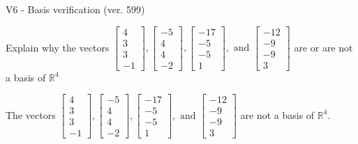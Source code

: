 \begin{exercise}
  \begin{exerciseTitle}V6 - Basis verification (ver. 599)\end{exerciseTitle}
  \begin{exerciseStatement}
    Explain why the vectors \(\left[\begin{array}{r}
4 \\
3 \\
3 \\
-1
\end{array}\right] , \left[\begin{array}{r}
-5 \\
4 \\
4 \\
-2
\end{array}\right] , \left[\begin{array}{r}
-17 \\
-5 \\
-5 \\
1
\end{array}\right] , \text{ and } \left[\begin{array}{r}
-12 \\
-9 \\
-9 \\
3
\end{array}\right]\) are or are not a basis of \(\mathbb{R}^4\)	


  \end{exerciseStatement}
  \begin{exerciseAnswer}
   The vectors \(\left[\begin{array}{r}
4 \\
3 \\
3 \\
-1
\end{array}\right] , \left[\begin{array}{r}
-5 \\
4 \\
4 \\
-2
\end{array}\right] , \left[\begin{array}{r}
-17 \\
-5 \\
-5 \\
1
\end{array}\right] , \text{ and } \left[\begin{array}{r}
-12 \\
-9 \\
-9 \\
3
\end{array}\right]\) 
  	 are not  a basis of \(\mathbb{R}^4\).
  


  \end{exerciseAnswer}
\end{exercise}